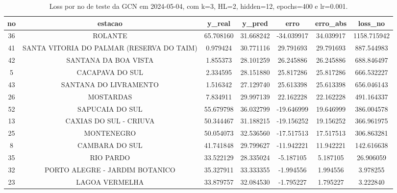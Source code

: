 \begin{table}[h]
\centering
\caption{Loss por no de teste da GCN em 2024-05-04, com k=3, HL=2, hidden=12, epochs=400 e lr=0.001.}
\label{tab:gcn_loss_k3_hl2_h12_e400_d20240504}
\begin{tabular}{ccccccc}
\toprule
no & estacao & y\_real & y\_pred & erro & erro\_abs & loss\_no \\
\midrule
36 & ROLANTE & 65.708160 & 31.668242 & -34.039917 & 34.039917 & 1158.715942 \\
41 & SANTA VITORIA DO PALMAR (RESERVA DO TAIM) & 0.979424 & 30.771116 & 29.791693 & 29.791693 & 887.544983 \\
42 & SANTANA DA BOA VISTA & 1.855373 & 28.101259 & 26.245886 & 26.245886 & 688.846497 \\
5 & CACAPAVA DO SUL & 2.334595 & 28.151880 & 25.817286 & 25.817286 & 666.532227 \\
43 & SANTANA DO LIVRAMENTO & 1.516342 & 27.129740 & 25.613398 & 25.613398 & 656.046143 \\
26 & MOSTARDAS & 7.834911 & 29.997139 & 22.162228 & 22.162228 & 491.164337 \\
52 & SAPUCAIA DO SUL & 55.679798 & 36.032799 & -19.646999 & 19.646999 & 386.004578 \\
13 & CAXIAS DO SUL - CRIUVA & 50.344467 & 31.188215 & -19.156252 & 19.156252 & 366.961975 \\
25 & MONTENEGRO & 50.054073 & 32.536560 & -17.517513 & 17.517513 & 306.863281 \\
8 & CAMBARA DO SUL & 41.741848 & 29.799627 & -11.942221 & 11.942221 & 142.616638 \\
35 & RIO PARDO & 33.522129 & 28.335024 & -5.187105 & 5.187105 & 26.906059 \\
32 & PORTO ALEGRE - JARDIM BOTANICO & 35.327911 & 33.333355 & -1.994556 & 1.994556 & 3.978255 \\
23 & LAGOA VERMELHA & 33.879757 & 32.084530 & -1.795227 & 1.795227 & 3.222840 \\
\bottomrule
\end{tabular}
\end{table}
